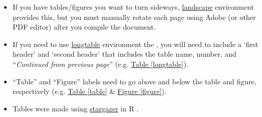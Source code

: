 \begin{itemize}
	 	\begin{itemize} 
	 		\item If you have tables/figures you want to turn sideways, \href{https://www.ctan.org/pkg/landscape?lang=en}{\textsf{landscape}} environment provides this, but you must manually rotate each page using Adobe (or other PDF editor) after you compile the document. 
	 		\item If you need to use \href{https://www.ctan.org/pkg/longtable?lang=en}{\textsf{longtable}} environment the , you will need to include a `first header' and `second header' that includes the table name, number, and ``\textit{Continued from previous page}'' (e.g. \hyperref[longtable]{Table \ref{longtable}}). 
	 		\item ``Table'' and ``Figure'' labels need to go above and below the table and figure, respectively (e.g. \hyperref[table]{Table \ref{table}} \& \hyperref[figure]{Figure \ref{figure}}). 
	 		\item Tables were made using \href{https://cran.r-project.org/web/packages/stargazer/vignettes/stargazer.pdf}{\textsf{stargazer}} in R \citep{stargazer}.
	 	\end{itemize}
 \end{itemize}

